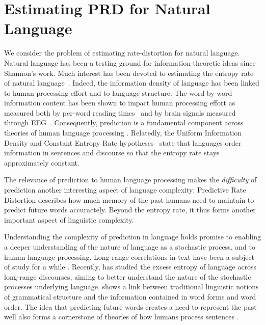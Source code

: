 \documentclass[entropy,article,submit,moreauthors,pdftex,10pt,a4paper]{Definitions/mdpi}
\begin{document}
\section{Estimating PRD for Natural Language}\label{sec:language}

We consider the problem of estimating rate-distortion for natural language.
Natural language has been a testing ground for information-theoretic ideas since Shannon's work.
Much interest has been devoted to estimating the entropy rate of natural language~\citep{shannon1951prediction,takahira2016entropy,bentz2017entropy,takahashi2018cross}.
Indeed, the information density of language has been linked to human processing effort and to language structure.
The word-by-word information content has been shown to impact human processing effort as measured both by per-word reading times~\citep{hale-probabilistic-2001,levy-expectation-based-2008,smith-effect-2013} and by brain signals measured through EEG~\citep{DBLP:conf/acl/FrankOGV13, kuperberg2016we}.
Consequently, prediction is a fundamental component across theories of human language processing  \citep{kuperberg2016we}.
Relatedly, the Uniform Information Density and Constant Entropy Rate hypotheses~\citep{fenk1980konstanz, genzel2002entropy, jaeger2007speakers} state that languages order information in sentences and discourse so that the entropy rate stays approximately constant. %

The relevance of prediction to human language processing makes the \emph{difficulty} of prediction another interesting aspect of language complexity:
Predictive Rate Distortion describes how much memory of the past humans need to maintain to predict future words accuractely.
Beyond the entropy rate, it thus forms another important aspect of linguistic complexity.


Understanding the complexity of prediction in language holds promise to enabling a deeper understanding of the nature of language as a stochastic process, and to human language processing.
Long-range correlations in text have been a subject of study for a while \citep{schenkel1993long,ebeling1994entropy,ebeling1995long,altmann2012origin,yang2016long,chen2018quantifying}.
Recently, \cite{dkebowski2018natural} has studied the excess entropy of language across long-range discourses, aiming to better understand the nature of the stochastic processes underlying language.
\cite{koplenig2017statistical} shows a link between traditional linguistic notions of grammatical structure and the information contained in word forms and word order.
The idea that predicting future words creates a need to represent the past well also forms a cornerstone of theories of how humans process sentences \citep{gibson-linguistic-1998,futrell-noisy-context-2017}.
\end{document}
